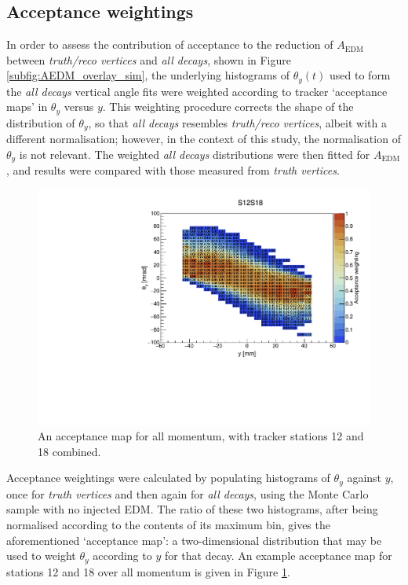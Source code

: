 \subsection{Acceptance weightings}\label{sec:AcceptanceWeightings}

In order to assess the contribution of acceptance to the reduction of $A_{\text{EDM}}$ between \textit{truth/reco vertices} and \textit{all decays}, shown in Figure \ref{subfig:AEDM_overlay_sim}, the underlying histograms of $\theta_{y}(t)$ used to form the \textit{all decays} vertical angle fits were weighted according to tracker `acceptance maps' in $\theta_{y}$ versus $y$. This weighting procedure corrects the shape of the distribution of $\theta_{y}$, so that \textit{all decays} resembles \textit{truth/reco vertices}, albeit with a different normalisation; however, in the context of this study, the normalisation of $\theta_{y}$ is not relevant. The weighted \textit{all decays} distributions were then fitted for $A_{\text{EDM}}$, and results were compared with those measured from \textit{truth vertices}.%

\begin{figure}[t!]
\centering{}
\includegraphics[trim={0 0 0 1cm},clip,width=.69\textwidth]{Images/Chapter5/S12S18_AcceptanceMapY_0_3127_MeV.pdf}
\caption{An acceptance map for all momentum, with tracker stations 12 and 18 combined.}
\label{fig:S12S18_AcceptanceMapY_0_3127_MeV}
\end{figure}

Acceptance weightings were calculated by populating histograms of $\theta_{y}$ against $y$, once for \textit{truth vertices} and then again for \textit{all decays}, using the Monte Carlo sample with no injected EDM. The ratio of these two histograms, after being normalised according to the contents of its maximum bin, gives the aforementioned `acceptance map': a two-dimensional distribution that may be used to weight $\theta_{y}$ according to $y$ for that decay. An example acceptance map for stations 12 and 18 over all momentum is given in Figure \ref{fig:S12S18_AcceptanceMapY_0_3127_MeV}. 

